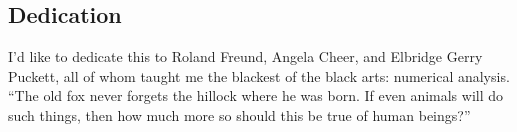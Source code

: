 \subsection*{Dedication}
I'd like to dedicate this to Roland Freund, Angela Cheer, and Elbridge
Gerry Puckett, all of whom taught me the blackest of the black arts:
numerical analysis. ``The old fox never forgets the hillock where he was
born. If even animals will do such things, then how much more so should
this be true of human beings?''
